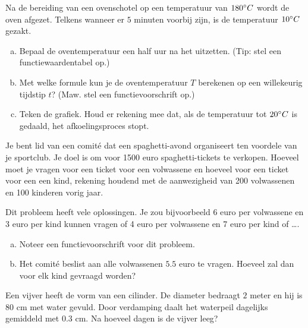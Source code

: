 \documentclass[12pt]{article}
\begin{document}
\begin{oefening}
Na de bereiding van een ovenschotel op een temperatuur van $180^\circ C$ wordt de oven afgezet. Telkens wanneer er $5$ minuten voorbij zijn, is de temperatuur $10^\circ C$ gezakt.
\begin{enumerate}[(a)]
  \item Bepaal de oventemperatuur een half uur na het uitzetten. (Tip: stel een functiewaardentabel op.)
  \item Met welke formule kun je de oventemperatuur $T$ berekenen op een willekeurig tijdstip $t$? (Maw. stel een functievoorschrift op.)
  \item Teken de grafiek. Houd er rekening mee dat, als de temperatuur tot $20^\circ C$ is gedaald, het afkoelingsproces stopt.
\end{enumerate}
\end{oefening}

\begin{oefening}
Je bent lid van een comité dat een spaghetti-avond organiseert ten voordele van je sportclub. Je doel is om voor 1500 euro spaghetti-tickets te verkopen. Hoeveel moet je vragen voor een ticket voor een volwassene en hoeveel voor een ticket voor een een kind, rekening houdend met de aanwezigheid van 200 volwassenen en 100 kinderen vorig jaar.

Dit probleem heeft vele oplossingen. Je zou bijvoorbeeld 6 euro per volwassene en 3 euro per kind kunnen vragen of 4 euro per volwassene en 7 euro per kind of \ldots.
\begin{enumerate}[(a)]
  \item Noteer een functievoorschrift voor dit probleem.
  \item Het comité beslist aan alle volwassenen $5.5$ euro te vragen. Hoeveel zal dan voor elk kind gevraagd worden?
\end{enumerate}
\end{oefening}

\begin{oefening}
Een vijver heeft de vorm van een cilinder. De diameter bedraagt $2$ meter en hij is $80$ cm met water gevuld. Door verdamping daalt het waterpeil dagelijks gemiddeld met $0.3$ cm. Na hoeveel dagen is de vijver leeg?
\end{oefening}
\end{document}
